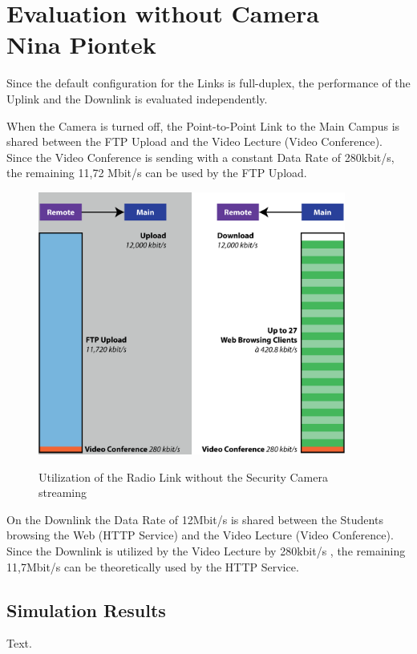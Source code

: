 \documentclass[a4paper,10pt]{book}\usepackage{graphicx}
\begin{document}
\chapter{Evaluation without Camera \\ {\large Nina Piontek}}
Since the default configuration for the Links is full-duplex, the performance of the Uplink and the Downlink is evaluated independently.

When the Camera is turned off, the Point-to-Point Link to the Main Campus is shared between the FTP Upload and the Video Lecture (Video Conference).
Since the Video Conference is sending with a constant Data Rate of 280kbit/s, the remaining 
11,72 Mbit/s can be used by the FTP Upload.
\begin{figure}[!ht]
  \centering
    \includegraphics[width=0.9\textwidth]{graphics-02.eps}
    \label{fig:g2}
    \caption{Utilization of the Radio Link without the Security Camera streaming}
\end{figure}

On the Downlink the Data Rate of 12Mbit/s is shared between the Students browsing the Web (HTTP Service) and the Video Lecture (Video Conference).
Since the Downlink is utilized by the Video Lecture by 280kbit/s , the remaining 11,7Mbit/s 
can be theoretically used by the HTTP Service.

\section{Simulation Results}

Text.
\end{document}
